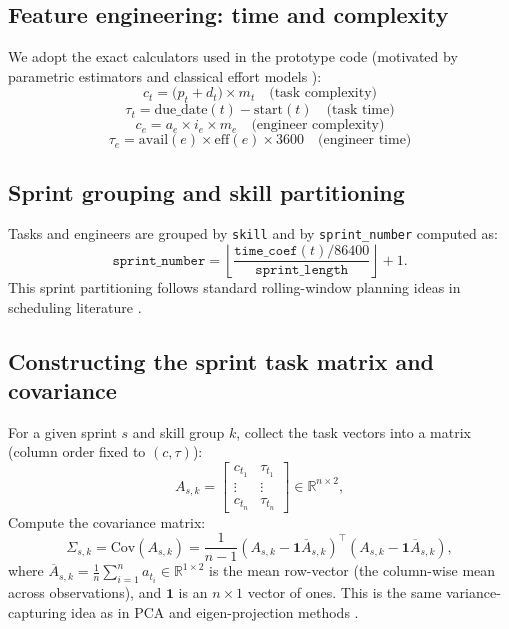 \documentclass[final,1p,times]{elsarticle}
\begin{document}
\subsection{Feature engineering: time and complexity}
We adopt the exact calculators used in the prototype code (motivated by parametric estimators and classical effort models \cite{cocomo,parametric_estimate}):
\begin{equation}
c_t = \big(p_t + d_t \big) \times m_t  \quad \text{(task complexity)} \label{eq:task_complexity}
\end{equation}
\begin{equation}
\tau_t = \mathrm{due\_date}(t) - \mathrm{start}(t) \quad \text{(task time)} \label{eq:task_time}
\end{equation}
\begin{equation}
c_e = a_e \times i_e \times m_e  \quad \text{(engineer complexity)} \label{eq:eng_complexity}
\end{equation}
\begin{equation}
\tau_e = \mathrm{avail}(e) \times \mathrm{eff}(e) \times 3600 \quad \text{(engineer time)} \label{eq:eng_time}
\end{equation}

\subsection{Sprint grouping and skill partitioning}
Tasks and engineers are grouped by \texttt{skill} and by \texttt{sprint\_number} computed as:
\[
\texttt{sprint\_number} = \left\lfloor \frac{\texttt{time\_coef}(t) / 86400}{\texttt{sprint\_length}} \right\rfloor + 1.
\]
This sprint partitioning follows standard rolling-window planning ideas in scheduling literature \cite{RollingHorizonSurvey2010,karger_sched_notes}.

\subsection{Constructing the sprint task matrix and covariance}
For a given sprint $s$ and skill group $k$, collect the task vectors into a matrix (column order fixed to $(c,\tau)$):
\[
A_{s,k} =
\begin{bmatrix}
c_{t_1} & \tau_{t_1} \\
\vdots & \vdots \\
c_{t_n} & \tau_{t_n}
\end{bmatrix}
\in \mathbb{R}^{n \times 2},
\]
Compute the covariance matrix:
\begin{equation}
\label{eq:cov}
\Sigma_{s,k} = \mathrm{Cov}(A_{s,k}) = \frac{1}{n-1} (A_{s,k} - \mathbf{1}\overline{A}_{s,k})^\top (A_{s,k} - \mathbf{1}\overline{A}_{s,k}),
\end{equation}
where $\overline{A}_{s,k}=\frac{1}{n}\sum_{i=1}^n a_{t_i}\in\mathbb{R}^{1\times 2}$ is the mean row-vector (the column-wise mean across observations), and $\mathbf{1}$ is an $n\times 1$ vector of ones. This is the same variance-capturing idea as in PCA and eigen-projection methods \cite{pca2017,eigen_projection}.
\end{document}
